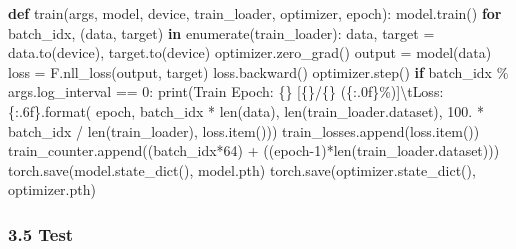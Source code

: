 \documentclass[
]{article}
\newenvironment{Shaded}{}{}
\newcommand{\BuiltInTok}[1]{#1}
\newcommand{\CharTok}[1]{\textcolor[rgb]{0.25,0.44,0.63}{#1}}
\newcommand{\ControlFlowTok}[1]{\textcolor[rgb]{0.00,0.44,0.13}{\textbf{#1}}}
\newcommand{\DecValTok}[1]{\textcolor[rgb]{0.25,0.63,0.44}{#1}}
\newcommand{\FloatTok}[1]{\textcolor[rgb]{0.25,0.63,0.44}{#1}}
\newcommand{\KeywordTok}[1]{\textcolor[rgb]{0.00,0.44,0.13}{\textbf{#1}}}
\newcommand{\NormalTok}[1]{#1}
\newcommand{\OperatorTok}[1]{\textcolor[rgb]{0.40,0.40,0.40}{#1}}
\newcommand{\SpecialCharTok}[1]{\textcolor[rgb]{0.25,0.44,0.63}{#1}}
\newcommand{\StringTok}[1]{\textcolor[rgb]{0.25,0.44,0.63}{#1}}
\begin{document}
\begin{Shaded}
\begin{Highlighting}[]
\KeywordTok{def}\NormalTok{ train(args, model, device, train\_loader, optimizer, epoch):}
\NormalTok{    model.train()}
    \ControlFlowTok{for}\NormalTok{ batch\_idx, (data, target) }\KeywordTok{in} \BuiltInTok{enumerate}\NormalTok{(train\_loader):}
\NormalTok{        data, target }\OperatorTok{=}\NormalTok{ data.to(device), target.to(device)}
\NormalTok{        optimizer.zero\_grad()}
\NormalTok{        output }\OperatorTok{=}\NormalTok{ model(data)}
\NormalTok{        loss }\OperatorTok{=}\NormalTok{ F.nll\_loss(output, target)}
\NormalTok{        loss.backward()}
\NormalTok{        optimizer.step()}
        \ControlFlowTok{if}\NormalTok{ batch\_idx }\OperatorTok{\%}\NormalTok{ args.log\_interval }\OperatorTok{==} \DecValTok{0}\NormalTok{:}
            \BuiltInTok{print}\NormalTok{(}\StringTok{\textquotesingle{}Train Epoch: }\SpecialCharTok{\{\}}\StringTok{ [}\SpecialCharTok{\{\}}\StringTok{/}\SpecialCharTok{\{\}}\StringTok{ (}\SpecialCharTok{\{:.0f\}}\StringTok{\%)]}\CharTok{\textbackslash{}t}\StringTok{Loss: }\SpecialCharTok{\{:.6f\}}\StringTok{\textquotesingle{}}\NormalTok{.}\BuiltInTok{format}\NormalTok{(}
\NormalTok{                epoch, batch\_idx }\OperatorTok{*} \BuiltInTok{len}\NormalTok{(data), }\BuiltInTok{len}\NormalTok{(train\_loader.dataset),}
                \FloatTok{100.} \OperatorTok{*}\NormalTok{ batch\_idx }\OperatorTok{/} \BuiltInTok{len}\NormalTok{(train\_loader), loss.item()))}
\NormalTok{            train\_losses.append(loss.item())}
\NormalTok{            train\_counter.append((batch\_idx}\OperatorTok{*}\DecValTok{64}\NormalTok{) }\OperatorTok{+}\NormalTok{ ((epoch}\OperatorTok{{-}}\DecValTok{1}\NormalTok{)}\OperatorTok{*}\BuiltInTok{len}\NormalTok{(train\_loader.dataset)))}
\NormalTok{            torch.save(model.state\_dict(), }\StringTok{\textquotesingle{}model.pth\textquotesingle{}}\NormalTok{)}
\NormalTok{            torch.save(optimizer.state\_dict(), }\StringTok{\textquotesingle{}optimizer.pth\textquotesingle{}}\NormalTok{)}
\end{Highlighting}
\end{Shaded}

\hypertarget{header-n65}{%
\subsubsection{3.5 Test}\label{header-n65}}
\end{document}
